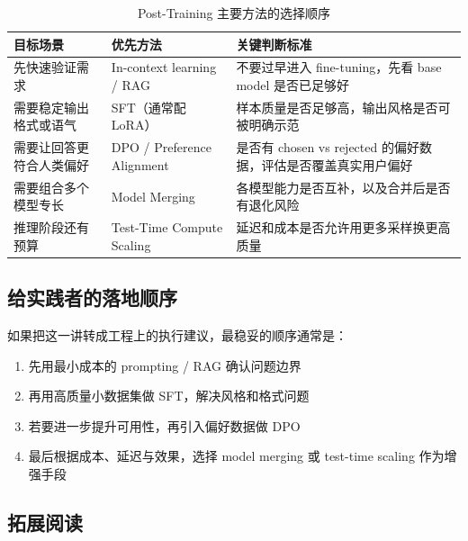 \documentclass[a4paper]{article}
\begin{document}
\begin{table}[H]
\centering
\begin{tabular}{p{} p{} p{}}
\toprule
目标场景 & 优先方法 & 关键判断标准 \\
\midrule
先快速验证需求 & In-context learning / RAG & 不要过早进入 fine-tuning，先看 base model 是否已足够好 \\
需要稳定输出格式或语气 & SFT（通常配 LoRA） & 样本质量是否足够高，输出风格是否可被明确示范 \\
需要让回答更符合人类偏好 & DPO / Preference Alignment & 是否有 chosen vs rejected 的偏好数据，评估是否覆盖真实用户偏好 \\
需要组合多个模型专长 & Model Merging & 各模型能力是否互补，以及合并后是否有退化风险 \\
推理阶段还有预算 & Test-Time Compute Scaling & 延迟和成本是否允许用更多采样换更高质量 \\
\bottomrule
\end{tabular}
\caption{Post-Training 主要方法的选择顺序}
\end{table}

\subsection{给实践者的落地顺序}

如果把这一讲转成工程上的执行建议，最稳妥的顺序通常是：

\begin{enumerate}
    \item 先用最小成本的 prompting / RAG 确认问题边界
    \item 再用高质量小数据集做 SFT，解决风格和格式问题
    \item 若要进一步提升可用性，再引入偏好数据做 DPO
    \item 最后根据成本、延迟与效果，选择 model merging 或 test-time scaling 作为增强手段
\end{enumerate}

\subsection{拓展阅读}
\end{document}
